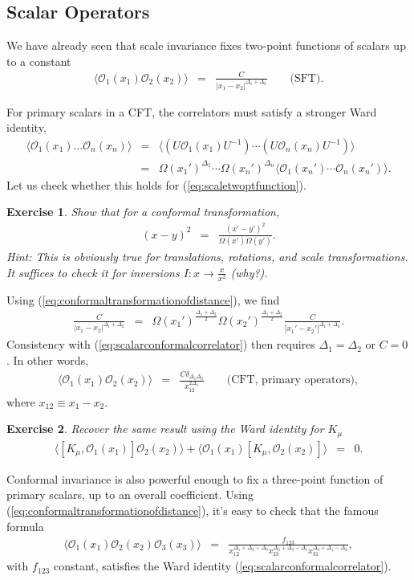 \documentclass{ws-rv9x6}
\newcommand\be{\begin{eqnarray}}
\newcommand\ee{\end{eqnarray}}
\newcommand\cO{\mathcal{O}}
\newcommand\<\langle
\renewcommand\>\rangle
\newcommand\de\delta
\newcommand\nn{\nonumber}
\renewcommand\.{\cdot}
\newcommand\De{\Delta}
\newtheorem{exercise}{Exercise}[section]
\begin{document}
\subsection{Scalar Operators}
\label{sec:conformalcorrelatorsscalars}

We have already seen that scale invariance fixes two-point functions of scalars up to a constant
\be
\label{eq:scaletwoptfunction}
\<\cO_1(x_1)\cO_2(x_2)\> &=& \frac{C}{|x_1-x_2|^{\De_1+\De_2}} \qquad\textrm{(SFT)}.
\ee

For primary scalars in a CFT, the correlators must satisfy a stronger Ward identity,
\be
\label{eq:scalarconformalcorrelator}
\<\cO_1(x_1)\dots\cO_n(x_n)\> &=& \<(U\cO_1(x_1)U^{-1}) \cdots (U\cO_n(x_n)U^{-1})\>\nn\\
 &=& \Omega(x_1')^{\De_1}\cdots\Omega(x_n')^{\De_n}\<\cO_1(x_n')\cdots \cO_n(x_n')\>.
\ee
Let us check whether this holds for (\ref{eq:scaletwoptfunction}).

\begin{exercise}
Show that for a conformal transformation,
\be
\label{eq:conformaltransformationofdistance}
(x-y)^2 &=& \frac{(x'-y')^2}{\Omega(x')\Omega(y')}.
\ee
Hint: This is obviously true for translations, rotations, and scale transformations. It suffices to check it for inversions $I:x\to\frac{x}{x^2}$ (why?).
\end{exercise}
Using (\ref{eq:conformaltransformationofdistance}), we find
\be
\frac{C}{|x_1-x_2|^{\De_1+\De_2}} &=& \Omega(x_1')^{\frac{\De_1+\De_2}{2}}\Omega(x_2')^{\frac{\De_1+\De_2}{2}}\frac{C}{|x_1'-x_2'|^{\De_1+\De_2}}.
\ee
Consistency with (\ref{eq:scalarconformalcorrelator}) then requires $\De_1=\De_2$ or $C=0$.  In other words,
\be
\<\cO_1(x_1)\cO_2(x_2)\> &=& \frac{C\de_{\De_1\De_2}}{x_{12}^{2\De_1}}\qquad\textrm{(CFT, primary operators)},
\ee
where $x_{12}\equiv x_1-x_2$.
\begin{exercise}
Recover the same result using the Ward identity for $K_\mu$
\be
\<[K_\mu,\cO_1(x_1)]\cO_2(x_2)\>+\<\cO_1(x_1)[K_\mu,\cO_2(x_2)]\> &=& 0.
\ee
\end{exercise}

Conformal invariance is also powerful enough to fix a three-point function of primary scalars, up to an overall coefficient.  Using (\ref{eq:conformaltransformationofdistance}), it's easy to check that the famous formula \cite{Polyakov:1970xd}
\be
\label{eq:conformalthreeptfunction}
\<\cO_1(x_1)\cO_2(x_2)\cO_3(x_3)\> &=& \frac{f_{123}}{x_{12}^{\De_1+\De_2-\De_3}x_{23}^{\De_2+\De_3-\De_1}x_{31}^{\De_3+\De_1-\De_2}},
\ee
with $f_{123}$ constant, satisfies the Ward identity (\ref{eq:scalarconformalcorrelator}).
\end{document}
